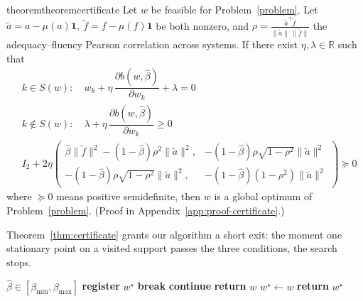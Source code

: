 \documentclass[11pt]{article}
\makeatletter
\newcommand{\qualification}[1]{\ifthmt@thisistheone#1\fi}
\makeatother
\begin{document}
\begin{restatable}{theorem}{theoremcertificate}
\setlength{\arraycolsep}{3pt}
\label{thm:certificate}
Let $w$ be feasible for Problem~\eqref{problem}. Let $\tilde{a}=a-\mu(a)\mathbf 1,\ \tilde{f}=f-\mu(f)\mathbf 1$ be both nonzero, and $\rho = \frac{\tilde{a}^\top\tilde{f}}{\|\tilde{a}\|\,\|\tilde{f}\|}$ the adequacy--fluency Pearson correlation across systems. If there exist $\eta,\lambda \in \mathbb R$ such that
\begin{align}
&k \in S(w): \quad w_k + \eta\,\dfrac{\partial b(w,\hat\beta)}{\partial w_k} + \lambda = 0 \tag{i}\\
&k \notin S(w): \quad \lambda + \eta\,\dfrac{\partial b(w,\hat\beta)}{\partial w_k} \ge 0 \tag{ii}\\
&{\scriptscriptstyle
I_2{+}2\eta
\begin{pmatrix}
\scriptscriptstyle\hat\beta\|\tilde f\|^2{-}(1{-}\hat\beta)\rho^2\|\tilde a\|^2 ,& \scriptscriptstyle-(1{-}\hat\beta) \rho\sqrt{1{-}\rho^2} \|\tilde a\|^2 \\[5pt]
\scriptscriptstyle-(1{-}\hat\beta)\rho\sqrt{1{-}\rho^2}\|\tilde a\|^2         ,& \scriptscriptstyle-(1{-}\hat\beta)(1{-}\rho^2)\|\tilde a\|^2 \end{pmatrix}{\succeq}0 \tag{iii}}
\end{align}
where $\succeq0$ means positive semidefinite, then $w$ is a global optimum of Problem~\eqref{problem}. \qualification{ (Proof in Appendix~\ref{app:proof-certificate}.)}
\end{restatable}

Theorem~\ref{thm:certificate} grants our algorithm a short exit: the moment one stationary point on a visited support passes the three conditions, the search stops.

\begin{algorithm}[t]
\caption{Exact reweighting for target $\hat\beta$}
\label{alg:reweight}
\begin{algorithmic}[1]
\REQUIRE $\hat\beta \in [\beta_{\min},\beta_{\max}]$ 
\STATE\textbf{register} $w^\star$
    \STATE \textbf{break} 
  \ENDIF
    \STATE \textbf{continue} 
  \ENDIF
      \STATE \textbf{return} $w$ 
    \ENDIF
      \STATE $w^\star \gets w$ 
    \ENDIF
  \ENDFOR
\ENDFOR
\STATE \textbf{return} $w^\star$
\end{algorithmic}
\end{algorithm}
\end{document}
